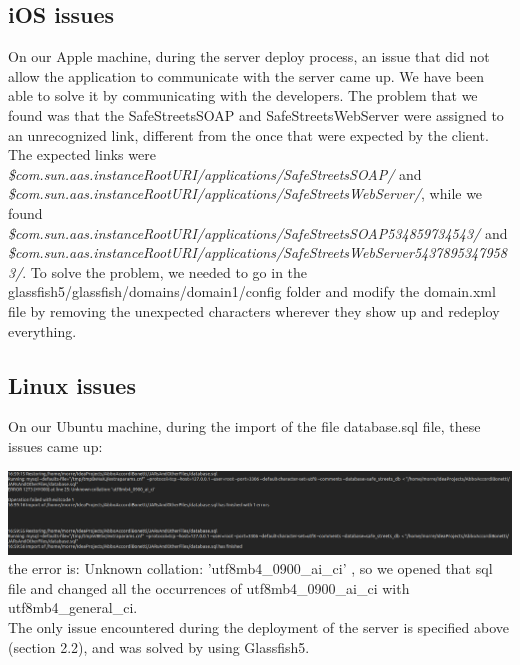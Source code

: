 \documentclass[../ATD.tex]{subfiles}
\begin{document}
    \subsection{iOS issues}\label{subsec:ios-issues}
    On our Apple machine,
    during the server deploy process, an issue that did not allow the application to communicate with the server came up.
    We have been able to solve it by communicating with the developers.
    The problem that we found was that the SafeStreetsSOAP and SafeStreetsWebServer were assigned to an unrecognized link, different from the once that were expected by the client.
    The expected links were \textit{\${com.sun.aas.instanceRootURI}/applications/SafeStreetsSOAP/} and \textit{\${com.sun.aas.instanceRootURI}/applications/SafeStreetsWebServer/},
    while we found \textit{\${com.sun.aas.instanceRootURI}/applications/SafeStreetsSOAP534859734543/} and \newline\textit{\${com.sun.aas.instanceRootURI}/applications/SafeStreetsWebServer54378953479583/}.
    \newline To solve the problem, we needed to go in the glassfish5/glassfish/domains/domain1/config folder and modify the domain.xml file by removing the unexpected characters wherever they show up and
    redeploy everything.

    \subsection{Linux issues}\label{subsec:linux-issues}
    On our Ubuntu machine,
    during the import of the file database.sql file, these issues came up:

    \includegraphics[scale = 0.3]{assets/errorDb.png}
    the error is: Unknown collation: 'utf8mb4\_0900\_ai\_ci' ,
    so we opened that sql file and changed all the occurrences of utf8mb4\_0900\_ai\_ci with utf8mb4\_general\_ci. \newline
    \\
    The only issue encountered during the deployment of the server is specified above (section 2.2), and was solved by using Glassfish5.
\end{document}
